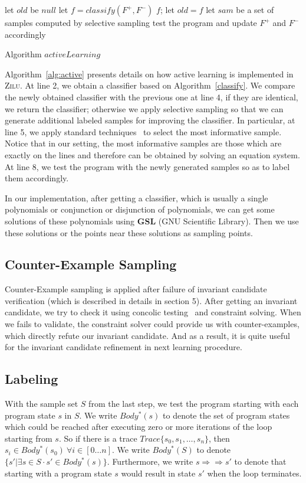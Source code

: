 \begin{algorithm}[t]
\SetAlgoVlined
\Indm
{}
\Indp
let $old$ be $null$\;
 {
    let $f = classify(F^+, F^-)$\;
     {
        \Return $f$;
    }
    let $old = f$\;
    let $sam$ be a set of samples computed by selective sampling\;
    test the program and update $F^+$ and $F^-$ accordingly\;
}
\caption{Algorithm $activeLearning$}
\label{alg:active}
\end{algorithm}

Algorithm~\ref{alg:active} presents details on how active learning is implemented in \textsc{Zilu}. 
At line 2, we obtain a classifier based on Algorithm~\ref{classify}. 
We compare the newly obtained classifier with the previous one at line 4, if they are identical, we return the classifier; 
otherwise we apply selective sampling so that we can generate additional labeled samples for improving the classifier. 
In particular, at line 5, we apply standard techniques~\cite{DBLP:conf/icml/SchohnC00} to select the most informative sample. 
Notice that in our setting, the most informative samples are those which are exactly on the lines and therefore can be obtained by solving an equation system. 
At line 8, we test the program with the newly generated samples so as to label them accordingly.

In our implementation, after getting a classifier, which is usually a single polynomials or conjunction or disjunction of polynomials,
we can get some solutions of these polynomials using \textbf{GSL} (GNU Scientific Library).
Then we use these solutions or the points near these solutions as sampling points.


\subsection{Counter-Example Sampling}
Counter-Example sampling is applied after failure of invariant candidate verification (which is described in details in section 5).
After getting an invariant candidate, we try to check it using concolic testing~\cite{} and constraint solving.
When we fails to validate, the constraint solver could provide us with counter-examples, 
which directly refute our invariant candidate.
And as a result, it is quite useful for the invariant candidate refinement in next learning procedure.



\subsection {Labeling}
With the sample set $S$ from the last step, we test the program starting with each program state $s$ in $S$. 
We write $Body^*(s)$ to denote the set of program states which could be reached after executing zero or more iterations of the loop starting from $s$.
So if there is a trace $Trace\{ s_0, s_1, \ldots, s_n\}$, then $s_i \in Body^*(s_0)\ \forall i \in [0 \ldots n]$.
We write $Body^*(S)$ to denote $\{s' | \exists s \in S \cdot s' \in Body^*(s)\}$. 
Furthermore, we write $s \Rightarrow\Rightarrow s'$ to denote that starting with a program state $s$ would result in state $s'$ when the loop terminates. 

